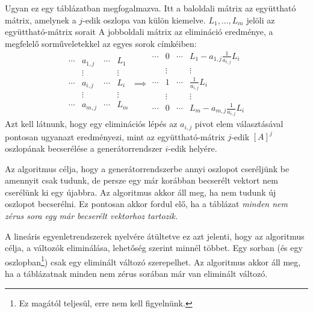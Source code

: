 \documentclass[9pt, a4paper, showtrims]{memoir}
\theoremstyle{plain}
\theoremstyle{remark}
\theoremstyle{definition}
\begin{document}
Ugyan ez egy táblázatban megfogalmazva.
Itt a baloldali mátrix az együttható mátrix, amelynek
a $j$-edik oszlopa van külön kiemelve.
$L_1,\ldots,L_m$ jelöli az együttható-mátrix sorait
A jobboldali mátrix az elimináció eredménye, a megfelelő sorműveletekkel az egyes sorok
címkéiben:
\[
	\begin{array}{ccc|c}
		\cdots & a_{1,j}         & \cdots & L_1    \\
		       & \vdots          &        & \vdots \\
		\cdots & \boxed{a_{i,j}} & \cdots & L_i    \\
		       & \vdots          &        & \vdots \\
		\cdots & a_{m,j}         & \cdots & L_m
	\end{array}
	\implies
	\begin{array}{ccc|c}
		\cdots & 0      & \cdots & L_1-a_{1,j}\frac{1}{a_{i,j}}L_i \\
		       & \vdots &        & \vdots                          \\
		\cdots & 1      & \cdots & \frac{1}{a_{i,j}}L_i            \\
		       & \vdots &        & \vdots                          \\
		\cdots & 0      & \cdots & L_m-a_{m,j}\frac{1}{a_{i,j}}L_i
	\end{array}
\]
Azt kell látnunk, hogy egy eliminációs lépés az $a_{i,j}$ pivot elem választásával pontosan ugyanazt eredményezi,
mint az együttható-mátrix $j$-edik $\left[ A \right]^j$ oszlopának becserélése a generátorrendszer $i$-edik helyére.

Az algoritmus célja, hogy
a generátorrendszerbe annyi oszlopot cseréljünk be amennyit csak tudunk,
de persze egy már korábban becserélt vektort nem cserélünk ki egy újabbra.
Az algoritmus akkor áll meg, ha nem tudunk új oszlopot becserélni.
Ez pontosan akkor fordul elő,
ha a táblázat \emph{minden nem zérus sora egy már becserélt vektorhoz tartozik.}


A lineáris egyenletrendszerek nyelvére átültetve ez azt jelenti,
hogy az algoritmus célja, a változók eliminálása, lehetőség szerint minnél többet.
Egy sorban (és egy oszlopban\footnote{Ez magától teljesül, erre nem kell figyelnünk.}) csak egy eliminált változó szerepelhet.
Az algoritmus akkor áll meg,
ha a táblázatnak minden nem zérus sorában már van eliminált változó.
\end{document}
